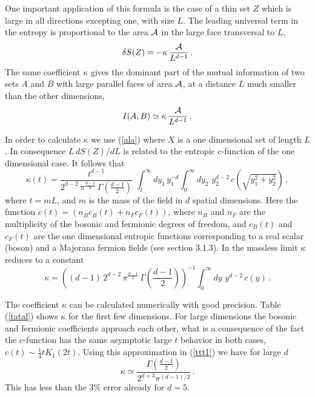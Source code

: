 \documentclass[11pt]{article}
\begin{document}
One important application of this formula is the case of a thin set $Z$ which is large in all directions excepting one, with size $L$. The leading universal term in the entropy is proportional to the area ${\cal A}$ in the large face transversal to $L$,
 \begin{equation}
\delta S(Z)= -\kappa\, \frac{{\cal A}}{L^{d-1}}\,.\label{tuy}
\end{equation}
The same coefficient $\kappa$ gives the dominant part of the mutual information of two sets $A$ and $B$ with large parallel faces of area ${\cal A}$, at a distance $L$ much smaller than the other dimensions,  
\begin{equation}
I(A,B)\simeq \kappa\, \frac{{\cal A}}{L^{d-1}}\,.\label{tuy1}
\end{equation}

In order to calculate $\kappa$ we use (\ref{ala}) where $X$ is a one dimensional set of length $L$. In consequence $L\,dS(Z)/dL$ is related to the entropic c-function of the one dimensional case. It follows that
\begin{equation}
\kappa(t) =   \frac{ t^{d-1}}{2^{d-2}\,\pi^{\frac{d-1}{2}}\,\Gamma\left(\frac{d-1}{2}\right)}\,\,\int_t^\infty dy_1\, y_1^{-d} \int_0^\infty d y_2\, \, y_2^{d-2}\, c\left(\sqrt{y_1^2+y_2^2}\right)\,,\label{masapan}
\end{equation}
where $t=m L$, and $m$ is the mass of the field in $d$ spatial dimensions.  Here the function $c(t)=(n_B c_B(t)+n_F c_F(t))$, where $n_B$ and $n_F$ are the multiplicity of the bosonic and fermionic degrees of freedom, and $c_B(t)$ and $c_F(t)$ are the one dimensional entropic functions corresponding to a real scalar (boson) and a Majorana fermion fields (see section 3.1.3). In the massless limit $\kappa$ reduces to a constant  
\begin{equation}
\kappa =  \left( (d-1)\,2^{d-2}\,\pi^{\frac{d-1}{2}}\,\Gamma\left(\frac{d-1}{2}\right)\right)^{-1} \int_0^\infty dy \,\,y^{d-2}\, c(y) \,.\label{ttt1}
\end{equation}


The coefficient $\kappa$ can be calculated numerically with good precision. Table (\ref{tatal}) shows $\kappa$ for the first few dimensions. For large dimensions the bosonic and fermionic coefficients approach each other, what is a consequence of the fact the c-function has the same asymptotic large $t$ behavior in both cases, $c(t)\sim \frac{1}{4} t K_1(2 t)$. Using this approximation in (\ref{ttt1}) we have for large $d$
\begin{equation}
\kappa\simeq \frac{\Gamma\left(\frac{d-1}{2}\right)}{2^{d+3}\pi^{(d-1)/2}}\,.
\end{equation} 
This has less than the 3\% error already for $d=5$.
\end{document}
